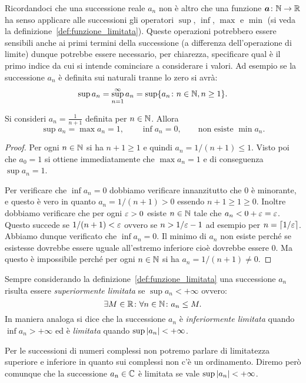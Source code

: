 Ricordandoci che una successione reale $a_n$ non è altro che
una funzione $\boldsymbol a \colon \mathbb N \to \mathbb R$
ha senso applicare alle successioni gli operatori
$\sup$, $\inf$, $\max$ e $\min$
(si veda la definizione~\ref{def:funzione_limitata}).
Queste operazioni potrebbero essere sensibili anche ai primi termini della
successione (a differenza dell'operazione di limite) dunque potrebbe
essere necessario, per chiarezza, specificare qual è il primo indice
da cui si intende cominciare a considerare i valori. Ad esempio
se la successione $a_n$ è definita sui naturali tranne lo zero
si avrà:
\[
  \sup a_n = \sup_{n=1}^\infty a_n = \sup\{a_n \colon n \in \mathbb N, n \ge 1\}.
\]

\begin{example}
Si consideri $a_n = \frac{1}{n+1}$ definita per $n\in \mathbb N$.
Allora
\[
  \sup a_n = \max a_n = 1, \qquad
  \inf a_n = 0, \qquad \text{non esiste }\min a_n.
\]
\end{example}
\begin{proof}
Per ogni $n \in \mathbb N$ si ha $n+1\ge 1$ e quindi $a_n = 1/(n+1) \le 1$.
Visto poi che $a_0 = 1$ si ottiene immediatamente che $\max a_n = 1$
e di conseguenza $\sup a_n = 1$.

Per verificare che $\inf a_n = 0$ dobbiamo verificare innanzitutto
che $0$ è minorante, e questo è vero in quanto $a_n = 1/(n+1)> 0$ essendo $n+1\ge 1 \ge 0$.
Inoltre dobbiamo verificare che per ogni $\varepsilon >0$ esiste $n\in \mathbb N$ tale
che $a_n < 0 + \varepsilon = \varepsilon$. Questo succede se $1/(n+1) < \varepsilon$ ovvero
se $n > 1/\varepsilon -1$ ad esempio per $n=\lceil 1/\varepsilon\rceil$.
Abbiamo dunque verificato che $\inf a_n = 0$.
Il minimo di $a_n$ non esiste perché se esistesse dovrebbe essere uguale
all'estremo inferiore cioè dovrebbe essere $0$. Ma questo è impossibile
perché per ogni $n\in \mathbb N$ si ha $a_n = 1/(n+1)\neq 0$.
\end{proof}

Sempre considerando la definizione~\ref{def:funzione_limitata}
una successione $a_n$ risulta essere
\emph{superiormente limitata}
%
%
se $\sup a_n < +\infty$
ovvero:
\[
  \exists M\in \mathbb R\colon \forall n \in \mathbb N\colon a_n \le M.
\]
In maniera analoga si dice che la successione $a_n$ è
\emph{inferiormente limitata}
%
quando $\inf a_n > +\infty$
ed è \emph{limitata}
%
%
quando $\sup {\left|a_n\right|}< +\infty$.

Per le successioni di numeri complessi non potremo parlare di
limitatezza superiore e inferiore in quanto sui complessi non c'è
un ordinamento.
Diremo però comunque che la successione
$a_n\in \mathbb C$ è limitata se vale $\sup {\left|a_n\right|} < +\infty$.

